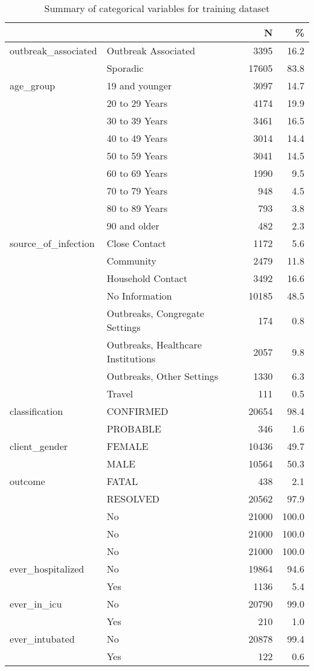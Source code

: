 \documentclass[
]{article}
\begin{document}
\begin{table}

\caption{\label{tab:trainsummary}Summary of categorical variables for training dataset}
\centering
\begin{tabular}[t]{llrr}
\toprule
  &    & N & \%\\
\midrule
outbreak\_associated & Outbreak Associated & 3395 & \num{16.2}\\
 & Sporadic & 17605 & \num{83.8}\\
age\_group & 19 and younger & 3097 & \num{14.7}\\
 & 20 to 29 Years & 4174 & \num{19.9}\\
 & 30 to 39 Years & 3461 & \num{16.5}\\
 & 40 to 49 Years & 3014 & \num{14.4}\\
 & 50 to 59 Years & 3041 & \num{14.5}\\
 & 60 to 69 Years & 1990 & \num{9.5}\\
 & 70 to 79 Years & 948 & \num{4.5}\\
 & 80 to 89 Years & 793 & \num{3.8}\\
 & 90 and older & 482 & \num{2.3}\\
source\_of\_infection & Close Contact & 1172 & \num{5.6}\\
 & Community & 2479 & \num{11.8}\\
 & Household Contact & 3492 & \num{16.6}\\
 & No Information & 10185 & \num{48.5}\\
 & Outbreaks, Congregate Settings & 174 & \num{0.8}\\
 & Outbreaks, Healthcare Institutions & 2057 & \num{9.8}\\
 & Outbreaks, Other Settings & 1330 & \num{6.3}\\
 & Travel & 111 & \num{0.5}\\
classification & CONFIRMED & 20654 & \num{98.4}\\
 & PROBABLE & 346 & \num{1.6}\\
client\_gender & FEMALE & 10436 & \num{49.7}\\
 & MALE & 10564 & \num{50.3}\\
outcome & FATAL & 438 & \num{2.1}\\
 & RESOLVED & 20562 & \num{97.9}\\
 & No & 21000 & \num{100.0}\\
 & No & 21000 & \num{100.0}\\
 & No & 21000 & \num{100.0}\\
ever\_hospitalized & No & 19864 & \num{94.6}\\
 & Yes & 1136 & \num{5.4}\\
ever\_in\_icu & No & 20790 & \num{99.0}\\
 & Yes & 210 & \num{1.0}\\
ever\_intubated & No & 20878 & \num{99.4}\\
 & Yes & 122 & \num{0.6}\\
\bottomrule
\end{tabular}
\end{table}
\end{document}
